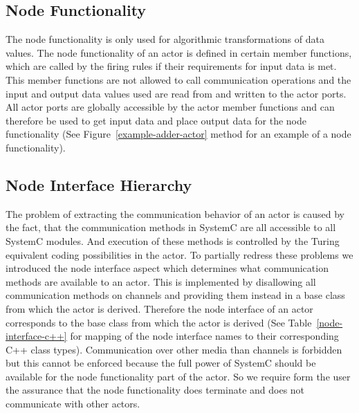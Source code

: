 %  

\subsection{Node Functionality}
The node functionality is only used for algorithmic transformations of data values.
The node functionality of an actor is defined in certain member functions,
which are called by the firing rules if their requirements for input data is met.
This member functions are not allowed to call communication operations and
the input and output data values used are read from
and written to the actor ports. All actor ports are globally accessible
by the actor member functions and can therefore be used to get input data
and place output data for the node functionality
(See Figure~\ref{example-adder-actor} method  for an example of a node functionality).

\subsection{Node Interface Hierarchy}
The problem of extracting the communication behavior of an actor is caused by the fact,
that the communication methods in SystemC are all accessible to all SystemC modules.
And execution of these methods is controlled by the Turing equivalent coding possibilities
in the actor. To partially redress these problems we introduced the node interface aspect
which determines what communication methods are available to an actor. This is implemented
by disallowing all communication methods on \SysteMoC{} channels and providing them instead
in a base class from which the actor is derived. Therefore the node interface of an actor
corresponds to the base class from which the actor is derived
(See Table~\ref{node-interface-c++} for mapping of the node interface names to their
corresponding C++ class types).
Communication over other media than \SysteMoC{} channels is forbidden but this cannot be enforced
because the full power of SystemC should be available for the node functionality part
of the actor. So we require form the \SysteMoC{} user the assurance that the
node functionality does terminate and does not communicate with other actors.

